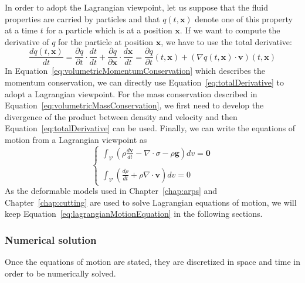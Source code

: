 In order to adopt the Lagrangian viewpoint, let us suppose that the fluid properties are carried by particles and that $q(t,\mathbf{x})$ denote one of this property at a time $t$ for a particle which is at a position $\mathbf{x}$. 
If we want to compute the derivative of $q$ for the particle at position $\mathbf{x}$, we have to use the total derivative:
\begin{equation}
\label{eq:totalDerivative}
\frac{dq(t,\mathbf{x})}{dt} = 
\frac{\partial q}{\partial t}\cdot\frac{dt}{dt} + \frac{\partial q}{\partial \mathbf{x}} \cdot \frac{d\mathbf{x}}{dt} 
= \frac{\partial q}{\partial t}(t,\mathbf{x}) + \left(\nabla q(t,\mathbf{x}) \cdot \mathbf{v}\right)(t,\mathbf{x})
\end{equation}
In Equation~\eqref{eq:volumetricMomentumConservation} which describes the momentum conservation, we can directly use Equation~\eqref{eq:totalDerivative} to adopt a Lagrangian viewpoint. 
For the mass conservation described in Equation~\eqref{eq:volumetricMassConservation}, we first need to develop the divergence of the product between density and velocity and then Equation~\eqref{eq:totalDerivative} can be used.
Finally, we can write the equations of motion from a Lagrangian viewpoint as
\begin{equation}
\label{eq:lagrangianMotionEquation}
\left\lbrace
\begin{array}{l}
\displaystyle 
\int_{\mathcal{V}} 
\left( 
\rho \frac{d\mathbf{v}}{dt}
- \nabla \cdot \sigma - \rho \mathbf{g}  \right) dv = \mathbf{0}
\\ \\
\displaystyle
\int_{\mathcal{V}} 
\left( \frac{d\rho}{dt} + \rho \nabla \cdot \mathbf{v} \right) dv = 0
\end{array}
\right.
\end{equation}
As the deformable models used in Chapter~\ref{chap:arps} and Chapter~\ref{chap:cutting} are used to solve Lagrangian equations of motion, we will keep Equation~\eqref{eq:lagrangianMotionEquation} in the following sections.
\subsubsection{Numerical solution}
\label{subsubsec:starMechanics_numericalSolution}
Once the equations of motion are stated, they are discretized in space and time in order to be numerically solved.

